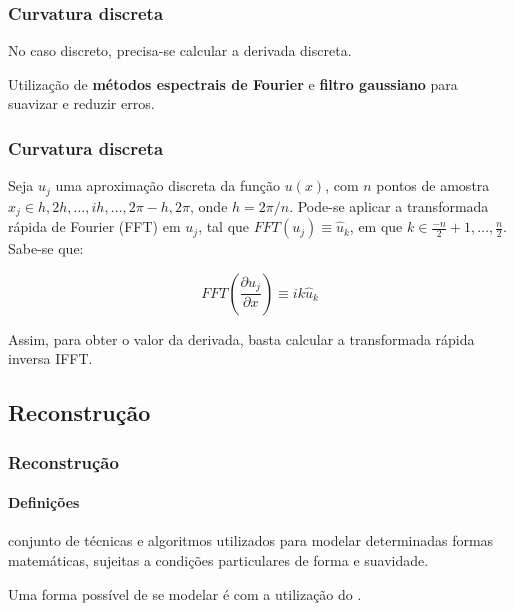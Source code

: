 \begin{frame}
\frametitle{Curvatura discreta}
	
	No caso discreto, precisa-se calcular a derivada discreta.
	
	\medskip
	
	Utilização de \textbf{métodos espectrais de Fourier} \cite{brethwashington} e \textbf{filtro gaussiano} para suavizar e reduzir erros.
	
\end{frame}

\begin{frame}
\frametitle{Curvatura discreta}

Seja $u_j$ uma aproximação discreta da função $u(x)$, com $n$ pontos de amostra $x_j \in h, 2h, \dots, ih, \dots, 2\pi - h, 2\pi$, onde $h = 2\pi/n$. Pode-se aplicar a transformada rápida de Fourier (FFT) em $u_j$, tal que $FFT(u_j) \equiv \hat{u}_k$, em que $k \in \frac{-n}{2}+1, \dots, \frac{n}{2}$. Sabe-se que:

\medskip

$$FFT \left (\frac{\partial u_j}{\partial x} \right) \equiv i k \hat{u}_k$$

\medskip

Assim, para obter o valor da derivada, basta calcular a transformada rápida inversa IFFT.
\end{frame}


\subsection{Reconstrução}

\begin{frame}
\frametitle{Reconstrução}
\framesubtitle{Definições}

 conjunto de técnicas e algoritmos utilizados para modelar determinadas formas matemáticas, sujeitas a condições particulares de forma e suavidade.


\medskip
Uma forma possível de se modelar é com a utilização do  \cite{Sorkine2006}.

\end{frame}

